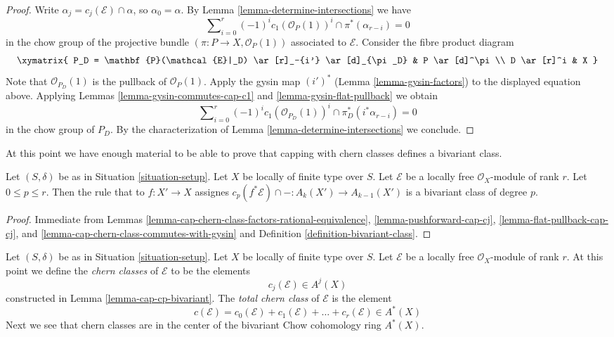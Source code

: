 \begin{proof}
Write $\alpha_j = c_j(\mathcal{E}) \cap \alpha$, so $\alpha_0 = \alpha$.
By Lemma \ref{lemma-determine-intersections} we have
$$
\sum\nolimits_{i = 0}^r
(-1)^i c_1(\mathcal{O}_P(1))^i \cap
\pi^*(\alpha_{r - i}) = 0
$$
in the chow group of the projective bundle
$(\pi : P \to X, \mathcal{O}_P(1))$
associated to $\mathcal{E}$. Consider the fibre product diagram
$$
\xymatrix{
P_D = \mathbf{P}(\mathcal{E}|_D) \ar[r]_-{i'} \ar[d]_{\pi_D} &
P \ar[d]^\pi \\
D \ar[r]^i & X
}
$$
Note that $\mathcal{O}_{P_D}(1)$ is the pullback of $\mathcal{O}_P(1)$.
Apply the gysin map $(i')^*$ (Lemma \ref{lemma-gysin-factors}) to the
displayed equation above.
Applying Lemmas \ref{lemma-gysin-commutes-cap-c1} and
\ref{lemma-gysin-flat-pullback} we obtain
$$
\sum\nolimits_{i = 0}^r
(-1)^i c_1(\mathcal{O}_{P_D}(1))^i \cap
\pi_D^*(i^*\alpha_{r - i}) = 0
$$
in the chow group of $P_D$.
By the characterization of Lemma \ref{lemma-determine-intersections}
we conclude.
\end{proof}

\noindent
At this point we have enough material to be able to prove that
capping with chern classes defines a bivariant class.

\begin{lemma}
\label{lemma-cap-cp-bivariant}
Let $(S, \delta)$ be as in Situation \ref{situation-setup}.
Let $X$ be locally of finite type over $S$.
Let $\mathcal{E}$ be a locally free $\mathcal{O}_X$-module
of rank $r$. Let $0 \leq p \leq r$.
Then the rule that to $f : X' \to X$ assignes
$c_p(f^*\mathcal{E}) \cap - : A_k(X') \to A_{k - 1}(X')$
is a bivariant class of degree $p$.
\end{lemma}

\begin{proof}
Immediate from Lemmas
\ref{lemma-cap-chern-class-factors-rational-equivalence},
\ref{lemma-pushforward-cap-cj},
\ref{lemma-flat-pullback-cap-cj}, and
\ref{lemma-cap-chern-class-commutes-with-gysin}
and Definition \ref{definition-bivariant-class}.
\end{proof}

\noindent
Let $(S, \delta)$ be as in Situation \ref{situation-setup}.
Let $X$ be locally of finite type over $S$.
Let $\mathcal{E}$ be a locally free $\mathcal{O}_X$-module
of rank $r$. At this point we define the {\it chern classes}
of $\mathcal{E}$ to be the elements
$$
c_j(\mathcal{E}) \in A^j(X)
$$
constructed in Lemma \ref{lemma-cap-cp-bivariant}. The
{\it total chern class} of $\mathcal{E}$ is the element
$$
c(\mathcal{E}) = 
c_0(\mathcal{E}) + c_1(\mathcal{E}) + \ldots + c_r(\mathcal{E})
\in A^*(X)
$$
Next we see that chern classes are in the center of the bivariant
Chow cohomology ring $A^*(X)$.

